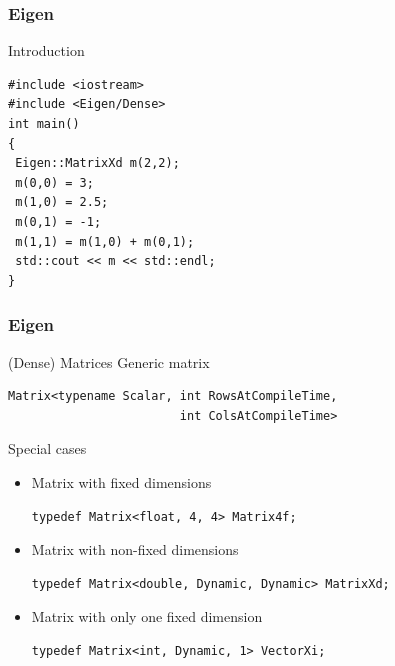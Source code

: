 \documentclass[smaller,a4paper]{beamer}
\begin{document}

\begin{frame}[fragile]

    \frametitle{Eigen}

    \begin{block}{Introduction}
        \begin{lstlisting}
#include <iostream>
#include <Eigen/Dense>
int main()
{
 Eigen::MatrixXd m(2,2);
 m(0,0) = 3;
 m(1,0) = 2.5;
 m(0,1) = -1;
 m(1,1) = m(1,0) + m(0,1);
 std::cout << m << std::endl;
}
        \end{lstlisting}
    \end{block}

\end{frame}


\begin{frame}[fragile]

    \frametitle{Eigen}

        \begin{block}{(Dense) Matrices}
            Generic matrix
            \begin{lstlisting}
Matrix<typename Scalar, int RowsAtCompileTime,
                        int ColsAtCompileTime>
            \end{lstlisting}
        \end{block}

        \begin{block}{Special cases}
            \begin{itemize}
                \item Matrix with fixed dimensions
                    \begin{lstlisting}
typedef Matrix<float, 4, 4> Matrix4f;
                    \end{lstlisting}
                \item Matrix with non-fixed dimensions
                    \begin{lstlisting}
typedef Matrix<double, Dynamic, Dynamic> MatrixXd;
                    \end{lstlisting}
                \item Matrix with only one fixed dimension
                    \begin{lstlisting}
typedef Matrix<int, Dynamic, 1> VectorXi;
                    \end{lstlisting}
            \end{itemize}
        \end{block}

\end{frame}
\end{document}
